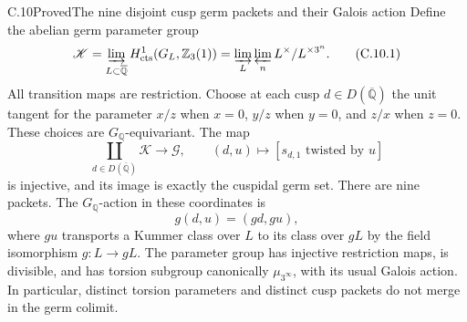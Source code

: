 \begin{statement}{C.10}{Proved}{The nine disjoint cusp germ packets and their Galois action}
Define the abelian germ parameter group
\[
 \mathscr K=\varinjlim_{L\subset\overline{\mathbb Q}}
       H^1_{\rm cts}(G_L,\mathbb Z_3(1))
   =\varinjlim_L\varprojlim_n L^\times/L^{\times3^n}.       \tag{C.10.1}
\]
All transition maps are restriction.  Choose at each cusp
$d\in D(\overline{\mathbb Q})$ the unit tangent for the parameter
$x/z$ when $x=0$, $y/z$ when $y=0$, and $z/x$ when $z=0$.
These choices are $G_{\mathbb Q}$-equivariant.
The map
\[
 \coprod_{d\in D(\overline{\mathbb Q})}\mathscr K
       \longrightarrow\mathscr G,
 \qquad (d,u)\longmapsto[s_{d,1}\text{ twisted by }u]
                                                               \tag{C.10.2}
\]
is injective, and its image is exactly the cuspidal germ set.
There are nine packets.  The $G_{\mathbb Q}$-action in these
coordinates is
\[
                         g(d,u)=(gd,gu),                     \tag{C.10.3}
\]
where $gu$ transports a Kummer class over $L$ to its class over
$gL$ by the field isomorphism $g:L\to gL$.
The parameter group has injective restriction maps, is divisible,
and has torsion subgroup canonically $\mu_{3^\infty}$, with its
usual Galois action.  In particular, distinct torsion parameters
and distinct cusp packets do not merge in the germ colimit.
\end{statement}
